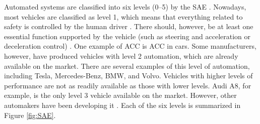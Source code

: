 \documentclass[a4paper,12pt]{article}
\begin{document}
Automated systems are classified into six levels (0–5) by the SAE \cite{article16}. Nowadays, most vehicles are classified as level 1, which means that everything related to safety is controlled by the human driver \cite{article16}. There should, however, be at least one essential function supported by the vehicle (such as steering and acceleration or deceleration control) \cite{article16}. One example of ACC is ACC in cars. Some manufacturers, however, have produced vehicles with level 2 automation, which are already available on the market. There are several examples of this level of automation, including Tesla, Mercedes-Benz, BMW, and Volvo. Vehicles with higher levels of performance are not as readily available as those with lower levels. Audi A8, for example, is the only level 3 vehicle available on the market. However, other automakers have been developing it \cite{article16}. Each of the six levels is summarized in Figure \ref{fig:SAE}.
\end{document}
